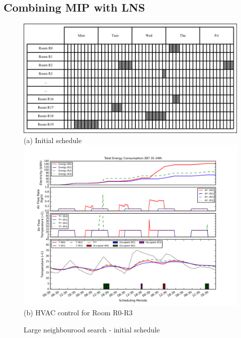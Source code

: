 \subsection{Combining MIP with LNS}\label{sec:lns_eg}

\begin{figure}
	\centering
		\includegraphics[width=0.9\linewidth]{figs/lns_sche_init1.jpg} \\
(a) Initial schedule  \\[6pt]
		\includegraphics[width=1\linewidth]{figs/lns_init.png}\\
(b) HVAC control for Room R0-R3  \\[6pt]
	\caption{Large neighbourood search - initial schedule}
	\label{fig:lns_init}
\end{figure}

